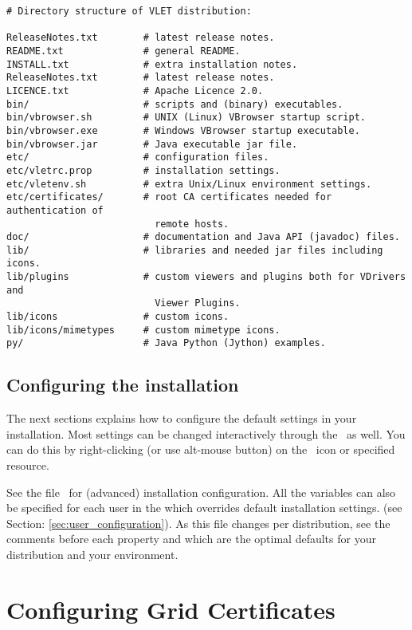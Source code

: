 \begin{boxedlisting}
\begin{verbatim}
# Directory structure of VLET distribution: 

ReleaseNotes.txt        # latest release notes.
README.txt              # general README.
INSTALL.txt             # extra installation notes. 
ReleaseNotes.txt        # latest release notes.
LICENCE.txt             # Apache Licence 2.0.
bin/                    # scripts and (binary) executables.
bin/vbrowser.sh         # UNIX (Linux) VBrowser startup script. 
bin/vbrowser.exe        # Windows VBrowser startup executable.
bin/vbrowser.jar        # Java executable jar file.
etc/                    # configuration files. 
etc/vletrc.prop         # installation settings.  
etc/vletenv.sh          # extra Unix/Linux environment settings. 
etc/certificates/       # root CA certificates needed for authentication of 
                          remote hosts.
doc/                    # documentation and Java API (javadoc) files. 
lib/                    # libraries and needed jar files including icons.
lib/plugins             # custom viewers and plugins both for VDrivers and 
                          Viewer Plugins.  
lib/icons               # custom icons. 
lib/icons/mimetypes     # custom mimetype icons.
py/                     # Java Python (Jython) examples.  
\end{verbatim}
\end{boxedlisting}
 
\subsection{Configuring the installation}

 The next sections explains how to configure the default settings in your
 installation. 
 Most settings can be changed interactively through the \vbrowser\ as well.
 You can do this by right-clicking (or use alt-mouse button) on
 the \myvle\ icon or specified resource.
\par
 See the file \VLETCONF\ for (advanced) installation configuration. All the
 variables can also be specified for each user in the
  which overrides default installation settings. (see
 Section: \ref{sec:user_configuration}). As this file changes per distribution,
 see the comments before each property and which are the optimal defaults for your
 distribution and your environment. \\


\section{Configuring Grid Certificates}

